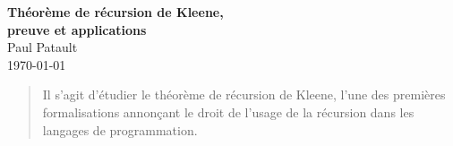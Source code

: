 \thispagestyle{empty}

\vspace*{1.3cm}
\begin{center}
    \textbf{\LARGE Théorème de récursion de Kleene,\\preuve et applications} \\
    \bigskip\bigskip
    {\large Paul Patault} \\
    \bigskip
    \today
    \bigskip
\end{center}

\begin{abstract}
    Il s'agit d'étudier le théorème de récursion de Kleene, l'une des premières
    formalisations annonçant le droit de l'usage de la récursion dans les
    langages de programmation.
\end{abstract}
